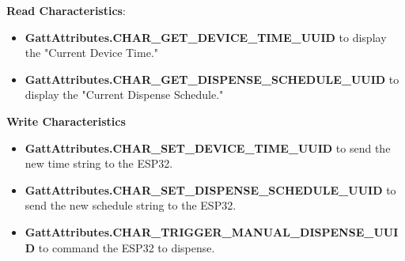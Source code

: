 \textbf{Read Characteristics}:
\begin{itemize}
	\item \textbf{GattAttributes.CHAR\_GET\_DEVICE\_TIME\_UUID} to display the "Current Device Time."
	\item \textbf{GattAttributes.CHAR\_GET\_DISPENSE\_SCHEDULE\_UUID} to display the "Current Dispense Schedule."
\end{itemize}

\textbf{Write Characteristics}
\begin{itemize}
	\item \textbf{GattAttributes.CHAR\_SET\_DEVICE\_TIME\_UUID} to send the new time string to the ESP32.
	\item \textbf{GattAttributes.CHAR\_SET\_DISPENSE\_SCHEDULE\_UUID} to send the new schedule string to the ESP32.
	\item \textbf{GattAttributes.CHAR\_TRIGGER\_MANUAL\_DISPENSE\_UUID} to command the ESP32 to dispense.
\end{itemize}

